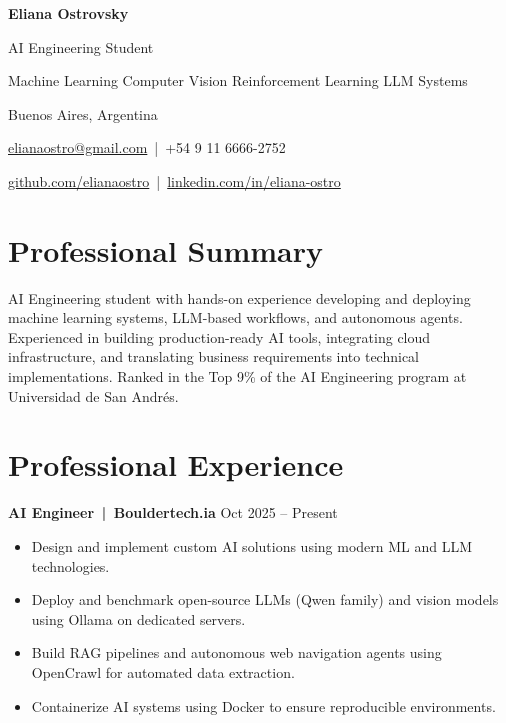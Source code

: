 \documentclass[a4paper,11pt]{article}
\begin{document}
{\LARGE\bfseries Eliana Ostrovsky}\par\smallskip
{\large AI Engineering Student}\par\smallskip
Machine Learning \textbullet{} Computer Vision \textbullet{} Reinforcement Learning \textbullet{} LLM Systems\par
\smallskip
Buenos Aires, Argentina\par
\href{mailto:elianaostro@gmail.com}{elianaostro@gmail.com} \,|\, +54 9 11 6666-2752\par
\href{https://github.com/elianaostro}{github.com/elianaostro} \,|\, \href{https://linkedin.com/in/eliana-ostro}{linkedin.com/in/eliana-ostro}

\medskip

\section*{Professional Summary}

AI Engineering student with hands-on experience developing and deploying machine learning systems, LLM-based workflows, and autonomous agents. Experienced in building production-ready AI tools, integrating cloud infrastructure, and translating business requirements into technical implementations. Ranked in the Top 9\% of the AI Engineering program at Universidad de San Andrés.

\section*{Professional Experience}

\textbf{AI Engineer \,|\, Bouldertech.ia} \hfill Oct 2025 -- Present
\begin{itemize}
    \item Design and implement custom AI solutions using modern ML and LLM technologies.
    \item Deploy and benchmark open-source LLMs (Qwen family) and vision models using Ollama on dedicated servers.
    \item Build RAG pipelines and autonomous web navigation agents using OpenCrawl for automated data extraction.
    \item Containerize AI systems using Docker to ensure reproducible environments.
\end{itemize}
\end{document}
